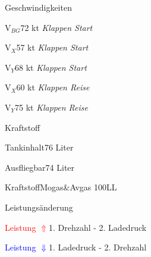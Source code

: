 \begin{memoryitem}
  \begin{checklist}{Geschwindigkeiten}
    \item{V$_{BG}$}{72 kt \textit{Klappen Start}}
    \item{V$_{X}$}{57 kt \textit{Klappen Start}}
    \item{V$_{Y}$}{68 kt \textit{Klappen Start}}
    \item{V$_{X}$}{60 kt \textit{Klappen Reise}}
    \item{V$_{Y}$}{75 kt \textit{Klappen Reise}}
  \end{checklist}
  \begin{checklist}{Kraftstoff}
    \item{Tankinhalt}{76 Liter}
    \item{Ausfliegbar}{74 Liter}
    \item{Kraftstoff}{Mogas\&Avgas 100LL}
  \end{checklist}
\end{memoryitem}

\begin{memoryitem}
  \begin{checklist}{Leistungsänderung}
    \item{\textcolor{red}{Leistung $\Uparrow$}}{1. Drehzahl - 2. Ladedruck}
    \item{\textcolor{blue}{Leistung $\Downarrow$}}{1. Ladedruck - 2. Drehzahl}
\end{checklist}
\end{memoryitem}

